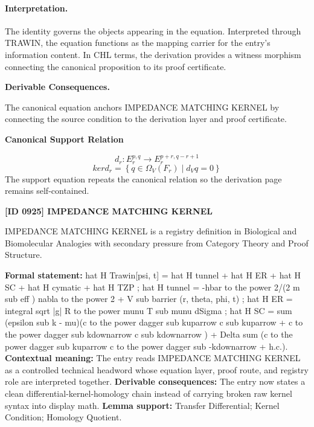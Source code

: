 \paragraph{Interpretation.}
The identity governs the objects appearing in the equation. Interpreted through TRAWIN, the equation functions as the mapping carrier for the entry’s information content. In CHL terms, the derivation provides a witness morphism connecting the canonical proposition to its proof certificate.

\par\vspace{0.35em}
\noindent\textbf{Derivable Consequences.}\quad
\begingroup
\footnotesize
\raggedright
The canonical equation anchors IMPEDANCE MATCHING KERNEL by connecting the source condition to the derivation layer and proof certificate.
\par\endgroup

\noindent\textbf{Canonical Support Relation}\par
\[
d_r\colon E_r^{p,q}\to E_r^{p+r,q-r+1}
\]
\[
ker d_r=\left\{q\in \Omega_V(F_r)\mid d_V q = 0\right\}
\]
\noindent The support equation repeats the canonical relation so the derivation page remains self-contained.\par

\clearpage
\noindent\textbf{[ID 0925] IMPEDANCE MATCHING KERNEL}\par
\vspace{0.35em}
\begingroup\small
{}
IMPEDANCE MATCHING KERNEL is a registry definition in Biological and Biomolecular Analogies with secondary pressure from Category Theory and Proof Structure.

\begingroup\footnotesize\setlength{\emergencystretch}{3em}\sloppy
\textbf{Formal statement:} hat H Trawin[psi, t] = hat H tunnel + hat H ER + hat H SC + hat H cymatic + hat H TZP ; hat H tunnel = -hbar to the power 2/(2 m sub eff ) nabla to the power 2 + V sub barrier (r, theta, phi, t) ; hat H ER = integral sqrt |g| R to the power munu T sub munu dSigma ; hat H SC = sum (epsilon sub k - mu)(c to the power dagger sub kuparrow c sub kuparrow + c to the power dagger sub kdownarrow c sub kdownarrow ) + Delta sum (c to the power dagger sub kuparrow c to the power dagger sub -kdownarrow + h.c.). \textbf{Contextual meaning:} The entry reads IMPEDANCE MATCHING KERNEL as a controlled technical headword whose equation layer, proof route, and registry role are interpreted together. \textbf{Derivable consequences:} The entry now states a clean differential-kernel-homology chain instead of carrying broken raw kernel syntax into display math. \textbf{Lemma support:} Transfer Differential; Kernel Condition; Homology Quotient.\par
\endgroup

